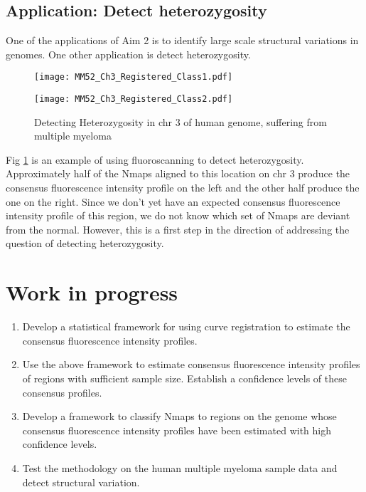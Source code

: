\documentclass[11pt]{extarticle} %
\begin{document}
\subsection*{Application: Detect heterozygosity}
One of the applications of Aim 2 is to identify large scale structural variations in genomes. One other application is detect heterozygosity. 
\begin{figure}[H]
    \centering
    \begin{minipage}{.5\textwidth}
        \centering
        \texttt{[image: MM52\_Ch3\_Registered\_Class1.pdf]}
        \label{fig:Fig3_1}
    \end{minipage}%
    \begin{minipage}{0.5\textwidth}
        \centering
        \texttt{[image: MM52\_Ch3\_Registered\_Class2.pdf]}
        \label{fig:Fig3_2}
    \end{minipage}
\caption{Detecting Heterozygosity in chr 3 of human genome, suffering from multiple myeloma}
\label{fig:Fig3}
\end{figure}

Fig \ref{fig:Fig3} is an example of using fluoroscanning to detect heterozygosity. Approximately half of the Nmaps aligned to this location on chr 3 produce the consensus fluorescence intensity profile on the left and the other half produce the one on the right. Since we don't yet have an expected consensus fluorescence intensity profile of this region, we do not know which set of Nmaps are deviant from the normal. However, this is a first step in the direction of addressing the question of detecting heterozygosity. 

\section*{Work in progress}
\begin{enumerate}
\item Develop a statistical framework for using curve registration to estimate the consensus fluorescence intensity profiles.
\item Use the above framework to estimate consensus fluorescence intensity profiles of regions with sufficient sample size. Establish a confidence levels of these consensus profiles. 
\item Develop a framework to classify Nmaps to regions on the genome whose consensus fluorescence intensity profiles have been estimated with high confidence levels.
\item Test the methodology on the human multiple myeloma sample data and detect structural variation.
\end{enumerate}
%
%
\end{document}
